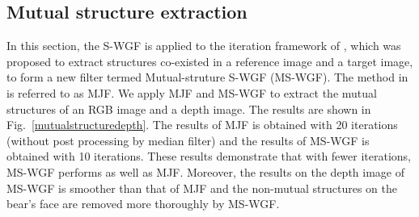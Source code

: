 \documentclass[10pt,twocolumn,letterpaper]{article}
\begin{document}
\subsection{Mutual structure extraction}
In this section, the S-WGF is applied to the iteration framework of \cite{msfjf}, which was proposed to extract structures co-existed in a reference image and a target image, to form a new filter termed Mutual-struture S-WGF (MS-WGF). The method in \cite{msfjf} is referred to as MJF. We apply MJF and MS-WGF to extract the mutual structures of an RGB image and a depth image. The results are shown in Fig.~\ref{mutualstructuredepth}. The results of MJF is obtained with 20 iterations (without post processing by median filter) and the results of MS-WGF is obtained with 10 iterations. These results demonstrate that with fewer iterations, MS-WGF performs as well as MJF. Moreover, the results on the depth image of MS-WGF is smoother than that of MJF and the non-mutual structures on the bear's face are removed more thoroughly by MS-WGF.
\end{document}
